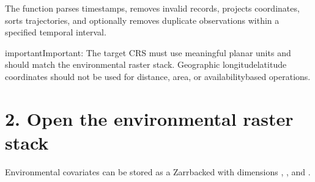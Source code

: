 \documentclass[letterpaper,10pt,english]{sphinxmanual}
\begin{document}
\begin{sphinxVerbatim}[commandchars=\\\{\}]
  

  
      

\end{sphinxVerbatim}

\sphinxAtStartPar
The function parses timestamps, removes invalid records, projects coordinates, sorts trajectories, and optionally removes duplicate observations within a specified temporal interval.

\begin{sphinxadmonition}{important}{Important:}
\sphinxAtStartPar
The target CRS must use meaningful planar units and should match the environmental raster stack. Geographic longitude\textendash{}latitude coordinates should not be used for distance\sphinxhyphen{}, area\sphinxhyphen{}, or availability\sphinxhyphen{}based operations.
\end{sphinxadmonition}


\section{2. Open the environmental raster stack}
\label{\detokenize{getting_started:open-the-environmental-raster-stack}}
\sphinxAtStartPar
Environmental covariates can be stored as a Zarr\sphinxhyphen{}backed  with dimensions , , and .
\end{document}
